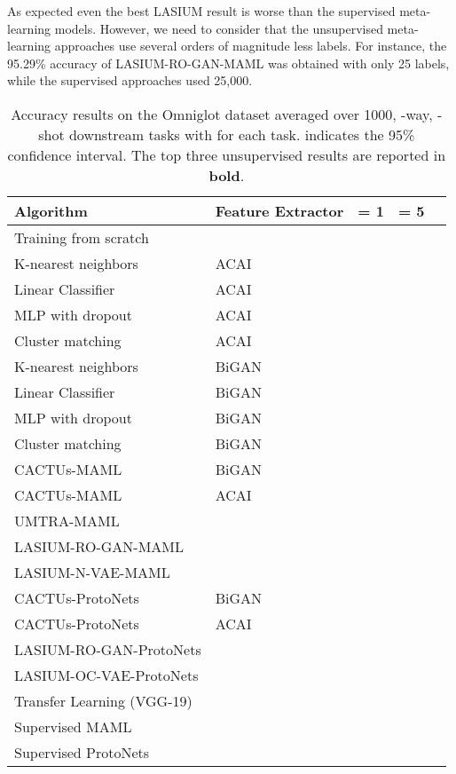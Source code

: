 \documentclass{article}
\begin{document}
As expected even the best LASIUM result is worse than the supervised meta-learning models. However, we need to consider that the unsupervised meta-learning approaches use several orders of magnitude less labels. For instance, the 95.29\% accuracy of LASIUM-RO-GAN-MAML was obtained with only 25 labels, while the supervised approaches used 25,000. 





\begin{table}[]
    \caption{Accuracy results on the Omniglot dataset averaged over 1000, -way, -shot downstream tasks with  for each task.  indicates the 95\% confidence interval. The top three unsupervised results are reported in {\bf bold}.}
    \label{tab:omniglot}
    \centering
    {\footnotesize
        \begin{tabular}{lllll}
            \toprule
            Algorithm & Feature Extractor &  = 1 &  = 5 \\
\midrule
            Training from scratch &  &   &  \\
K-nearest neighbors & ACAI &  &  \\
Linear Classifier & ACAI &  &  \\
MLP with dropout & ACAI &  &  \\
Cluster matching & ACAI &  &  \\
K-nearest neighbors & BiGAN &  &  \\
Linear Classifier & BiGAN &  &  \\
MLP with dropout & BiGAN &  &  \\
Cluster matching & BiGAN &  &  \\
\midrule
            CACTUs-MAML & BiGAN &  &  \\
CACTUs-MAML & ACAI &  &  \\
UMTRA-MAML &  &  &   \\
LASIUM-RO-GAN-MAML &  &  &   \\
            
            
LASIUM-N-VAE-MAML&  &  &  \\
\midrule
            CACTUs-ProtoNets & BiGAN &  &  \\
CACTUs-ProtoNets & ACAI &  &  \\
LASIUM-RO-GAN-ProtoNets &  &  &   \\
LASIUM-OC-VAE-ProtoNets &  &  & \\
\midrule
            Transfer Learning (VGG-19) &  &  & \\
Supervised MAML &  &  & \\
Supervised ProtoNets &  &  & \\
            \bottomrule
        \end{tabular}
    }
\end{table}
\end{document}
